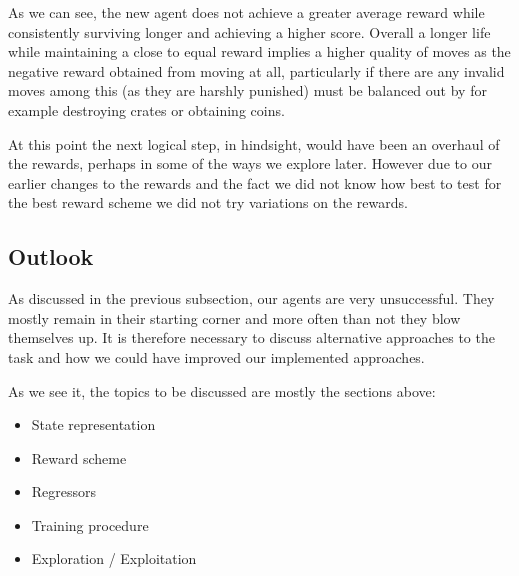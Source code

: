 As we can see, the new agent does not achieve a greater average reward while consistently surviving longer and achieving a higher score. Overall a longer life while maintaining a close to equal reward implies a higher quality of moves as the negative reward obtained from moving at all, particularly if there are any invalid moves among this (as they are harshly punished) must be balanced out by for example destroying crates or obtaining coins.

At this point the next logical step, in hindsight, would have been an overhaul of the rewards, perhaps in some of the ways we explore later. However due to our earlier changes to the rewards and the fact we did not know how best to test for the best reward scheme we did not try variations on the rewards.


\subsection{Outlook}
As discussed in the previous subsection, our agents are very unsuccessful. They mostly remain in their starting corner and more often than not they blow themselves up. It is therefore necessary to discuss alternative approaches to the task and how we could have improved our implemented approaches.\par


As we see it, the topics to be discussed are mostly the sections above:
\begin{itemize}
	\item State representation
	\item Reward scheme
	\item Regressors
	\item Training procedure
	\item Exploration / Exploitation
\end{itemize}

